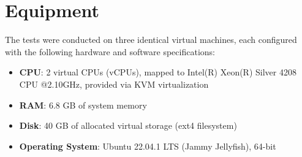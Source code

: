 \section{Equipment}
The tests were conducted on three identical virtual machines, each configured with the following hardware and software specifications:
\begin{itemize}
	\item \textbf{CPU}: 2 virtual CPUs (vCPUs), mapped to Intel(R) Xeon(R) Silver 4208 CPU @2.10GHz, provided via KVM virtualization
	\item \textbf{RAM}: 6.8 GB of system memory
	\item \textbf{Disk}: 40 GB of allocated virtual storage (ext4 filesystem)
	\item \textbf{Operating System}: Ubuntu 22.04.1 LTS (Jammy Jellyfish), 64-bit
\end{itemize}